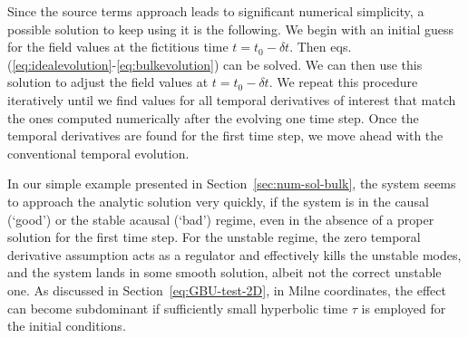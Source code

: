 \documentclass[aps, prd, showkeys,superscriptaddress, nofootinbib,floatfix]{revtex4-2}
\begin{document}
Since the source terms approach leads to significant numerical simplicity, a possible solution to keep using it is the following.  
We begin with an initial guess for the field values at the fictitious time $t = t_0 - \delta t$. Then eqs. (\ref{eq:idealevolution}-\ref{eq:bulkevolution}) can be solved. We can then use this solution to adjust the field values at $t = t_0 - \delta t$. We repeat this procedure iteratively until we find values for all temporal derivatives of interest that match the ones computed numerically after the evolving one time step. Once the temporal derivatives are found for the first time step, we move ahead with the conventional temporal evolution.


In our simple example presented in Section~\ref{sec:num-sol-bulk}, the system seems to approach the analytic solution very quickly, if the system is in the causal (`good') or the stable acausal (`bad') regime, even in the absence of a proper solution for the first time step. For the unstable regime, the zero temporal derivative assumption acts as a regulator and effectively kills the unstable modes, and the system lands in some smooth solution, albeit not the correct unstable one. As discussed in Section~\ref{eq:GBU-test-2D}, in Milne coordinates, the effect can become subdominant if sufficiently small hyperbolic time $\tau$ is employed for the initial conditions. 






\end{document}
